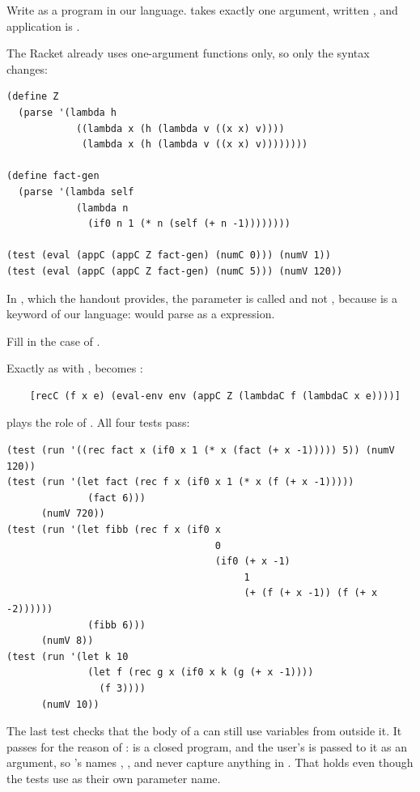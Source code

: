 \begin{exercise}
Write  as a program in our language.  takes exactly one argument, written , and application is .
\end{exercise}
\begin{solution}
The Racket  already uses one-argument functions only, so only the syntax changes:
\begin{lstlisting}
(define Z
  (parse '(lambda h
            ((lambda x (h (lambda v ((x x) v))))
             (lambda x (h (lambda v ((x x) v))))))))

(define fact-gen
  (parse '(lambda self
            (lambda n
              (if0 n 1 (* n (self (+ n -1))))))))

(test (eval (appC (appC Z fact-gen) (numC 0))) (numV 1))
(test (eval (appC (appC Z fact-gen) (numC 5))) (numV 120))
\end{lstlisting}
In , which the handout provides, the parameter is called  and not , because  is a keyword of our language:  would parse as a  expression.
\end{solution}

\begin{exercise}
Fill in the  case of .
\end{exercise}
\begin{solution}
Exactly as with ,  becomes :
\begin{lstlisting}
    [recC (f x e) (eval-env env (appC Z (lambdaC f (lambdaC x e))))]
\end{lstlisting}
 plays the role of . All four tests pass:
\begin{lstlisting}
(test (run '((rec fact x (if0 x 1 (* x (fact (+ x -1))))) 5)) (numV 120))
(test (run '(let fact (rec f x (if0 x 1 (* x (f (+ x -1)))))
              (fact 6)))
      (numV 720))
(test (run '(let fibb (rec f x (if0 x
                                    0
                                    (if0 (+ x -1)
                                         1
                                         (+ (f (+ x -1)) (f (+ x -2))))))
              (fibb 6)))
      (numV 8))
(test (run '(let k 10
              (let f (rec g x (if0 x k (g (+ x -1))))
                (f 3))))
      (numV 10))
\end{lstlisting}
The last test checks that the body of a  can still use variables from outside it. It passes for the reason of :  is a closed program, and the user's  is passed to it as an argument, so 's names , , and  never capture anything in . That holds even though the tests use  as their own parameter name.
\end{solution}

